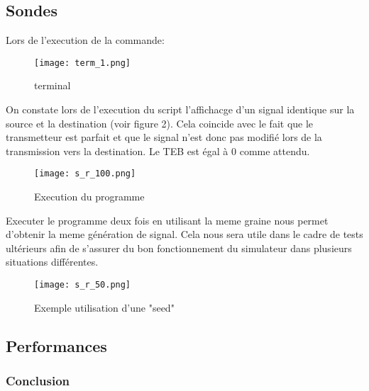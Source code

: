 \subsection{Sondes}

Lors de l'execution de la commande: 

\begin{figure}[h]
    \centering
    \texttt{[image: term\_1.png]}
    \caption{terminal}
\end{figure}

On constate lors de l'execution du script l'affichacge d'un signal identique sur la source et la destination (voir figure 2). Cela coincide 
avec le fait que le transmetteur est parfait et que le signal n'est donc pas modifié lors de la transmission vers la destination.
Le TEB est égal à 0 comme attendu.

\begin{figure}[h]
    \centering
    \texttt{[image: s\_r\_100.png]}
    \caption{Execution du programme}
\end{figure}

\pagebreak

Executer le programme deux fois en utilisant la meme graine nous permet d'obtenir la meme génération de signal.
Cela nous sera utile dans le cadre de tests ultérieurs afin de s'assurer du bon fonctionnement du simulateur dans plusieurs situations différentes.

\begin{figure}[h]
    \centering
    \texttt{[image: s\_r\_50.png]}
    \caption{Exemple utilisation d'une "seed"}
\end{figure}

\pagebreak

\subsection{Performances}



\subsubsection{Conclusion}
    
    

